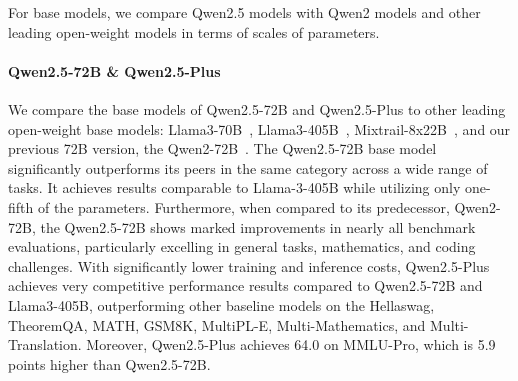 For base models, we compare Qwen2.5 models with Qwen2 models and other leading open-weight models in terms of scales of parameters.

\paragraph{Qwen2.5-72B \& Qwen2.5-Plus}
We compare the base models of Qwen2.5-72B and Qwen2.5-Plus to other leading open-weight base models: Llama3-70B~\citep{llama3}, Llama3-405B~\citep{llama3}, Mixtrail-8x22B~\citep{mixtral}, and our previous 72B version, the Qwen2-72B~\citep{qwen2}. The Qwen2.5-72B base model significantly outperforms its peers in the same category across a wide range of tasks. It achieves results comparable to Llama-3-405B while utilizing only one-fifth of the parameters. Furthermore, when compared to its predecessor, Qwen2-72B, the Qwen2.5-72B shows marked improvements in nearly all benchmark evaluations, particularly excelling in general tasks, mathematics, and coding challenges. With significantly lower training and inference costs, Qwen2.5-Plus achieves very competitive performance results compared to Qwen2.5-72B and Llama3-405B, outperforming other baseline models on the Hellaswag, TheoremQA, MATH, GSM8K, MultiPL-E, Multi-Mathematics, and Multi-Translation. Moreover, Qwen2.5-Plus achieves 64.0 on MMLU-Pro, which is 5.9 points higher than Qwen2.5-72B.



